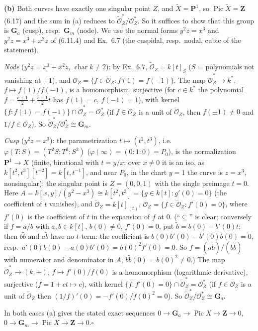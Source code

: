 \documentclass[11pt]{article}
\begin{document}
\textbf{(b)} Both curves have exactly one singular point $Z$, and $\tilde X=\mathbf P^1$, so $\operatorname{Pic}\tilde X=\mathbf Z$ (6.17) and the sum in (a) reduces to $\tilde{\mathcal O}_Z^*/\mathcal O_Z^*$. So it suffices to show that this group is $\mathbf G_a$ (cusp), resp.\ $\mathbf G_m$ (node). We use the normal forms $y^2z=x^3$ and $y^2z=x^3+x^2z$ of (6.11.4) and Ex.~6.7 (the cuspidal, resp.\ nodal, cubic of the statement).

\emph{Node} ($y^2z=x^3+x^2z$, $\operatorname{char}k\ne2$): by Ex.~6.7, $\tilde{\mathcal O}_Z=k[t]_{S}$ ($S$ = polynomials not vanishing at $\pm1$), and $\mathcal O_Z=\{f\in\tilde{\mathcal O}_Z:f(1)=f(-1)\}$. The map $\tilde{\mathcal O}_Z^*\to k^*$, $f\mapsto f(1)/f(-1)$, is a homomorphism, surjective (for $c\in k^*$ the polynomial $f=\frac{c+1}2+\frac{c-1}2t$ has $f(1)=c$, $f(-1)=1$), with kernel $\{f:f(1)=f(-1)\}\cap\tilde{\mathcal O}_Z^*=\mathcal O_Z^*$ (if $f\in\mathcal O_Z$ is a unit of $\tilde{\mathcal O}_Z$, then $f(\pm1)\ne0$ and $1/f\in\mathcal O_Z$). So $\tilde{\mathcal O}_Z^*/\mathcal O_Z^*\cong\mathbf G_m$.

\emph{Cusp} ($y^2z=x^3$): the parametrization $t\mapsto(t^2,t^3)$, i.e.\ $\varphi(T:S)=(T^2S:T^3:S^3)$ ($\varphi(\infty)=(0:1:0)=P_0$), is the normalization $\mathbf P^1\to X$ (finite, birational with $t=y/x$; over $x\ne0$ it is an iso, as $k[t^2,t^3][t^{-2}]=k[t,t^{-1}]$, and near $P_0$, in the chart $y=1$ the curve is $z=x^3$, nonsingular); the singular point is $Z=(0,0,1)$ with the single preimage $t=0$. Here $A=k[x,y]/(y^2-x^3)\cong k[t^2,t^3]=\{g\in k[t]:g'(0)=0\}$ (the coefficient of $t$ vanishes), and $\tilde{\mathcal O}_Z=k[t]_{(t)}$, $\mathcal O_Z=\{f\in\tilde{\mathcal O}_Z:f'(0)=0\}$, where $f'(0)$ is the coefficient of $t$ in the expansion of $f$ at $0$. (``$\subseteq$'' is clear; conversely if $f=a/b$ with $a,b\in k[t]$, $b(0)\ne0$, $f'(0)=0$, put $\tilde b=b(0)-b'(0)t$; then $b\tilde b$ and $a\tilde b$ have no $t$-term: the coefficient is $b(0)b'(0)-b'(0)b(0)=0$, resp.\ $a'(0)b(0)-a(0)b'(0)=b(0)^2f'(0)=0$. So $f=(a\tilde b)/(b\tilde b)$ with numerator and denominator in $A$, $b\tilde b(0)=b(0)^2\ne0$.) The map $\tilde{\mathcal O}_Z^*\to(k,+)$, $f\mapsto f'(0)/f(0)$ is a homomorphism (logarithmic derivative), surjective ($f=1+ct\mapsto c$), with kernel $\{f:f'(0)=0\}\cap\tilde{\mathcal O}_Z^*=\mathcal O_Z^*$ (if $f\in\mathcal O_Z$ is a unit of $\tilde{\mathcal O}_Z$ then $(1/f)'(0)=-f'(0)/f(0)^2=0$). So $\tilde{\mathcal O}_Z^*/\mathcal O_Z^*\cong\mathbf G_a$.

In both cases (a) gives the stated exact sequences $0\to\mathbf G_a\to\operatorname{Pic}X\to\mathbf Z\to0$, $0\to\mathbf G_m\to\operatorname{Pic}X\to\mathbf Z\to0$.\hfill$\square$
\end{document}
